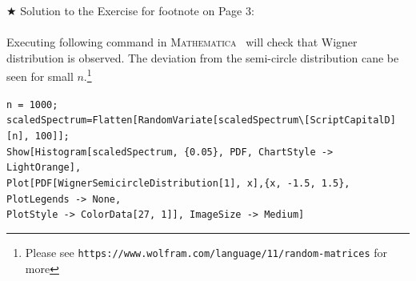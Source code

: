\documentclass[11pt]{article}
\newcommand{\MA}{\textsc{Mathematica}}
\begin{document}
\noindent $\bigstar$ Solution to the Exercise for footnote on Page 3:
\\  \\
Executing following command in \MA~ will check that Wigner distribution is 
observed. The deviation from the semi-circle distribution cane be seen for small 
$n$.\footnote{Please see \texttt{https://www.wolfram.com/language/11/random-matrices} for more}
\vspace{3mm} 
\begin{mdframed}[backgroundcolor=magenta!3]
	\begin{footnotesize} 
		\verb"n = 1000;"\\ 
		\verb"scaledSpectrum=Flatten[RandomVariate[scaledSpectrum\[ScriptCapitalD][n], 100]];"\\
		\verb"Show[Histogram[scaledSpectrum, {0.05}, PDF, ChartStyle -> LightOrange], "  \\ 
		\verb"Plot[PDF[WignerSemicircleDistribution[1], x],{x, -1.5, 1.5}, PlotLegends -> None, " \\
		\verb"PlotStyle -> ColorData[27, 1]], ImageSize -> Medium]"
	\end{footnotesize} 
\end{mdframed} 



\end{document}
